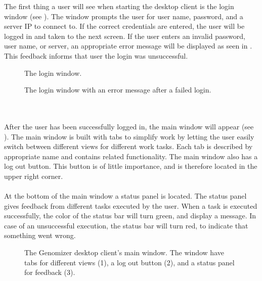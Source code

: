 The first thing a user will see when starting the desktop client is the login window (see ). The window prompts the user for user name, password, and a server IP to connect to. If the correct credentials are entered, the user will be logged in and taken to the next screen. If the user enters an invalid password, user name, or server, an appropriate error message will be displayed as seen in . This feedback informs that user the login was unsuccessful.
\begin{figure}[h]
	\caption{The login window.}
	\label{fig:des_login_window}
\end{figure}
\begin{figure}[h!]
	\caption{The login window with an error message after a failed login.}
	\label{fig:des_login_failed}
\end{figure}
\\\\
After the user has been successfully logged in, the main window will appear (see ). The main window  is built with tabs to simplify work by letting the user easily switch between different views for different work tasks. Each tab is described by appropriate name and contains related functionality. The main window also has a log out button. This button is of little importance, and is therefore located in the upper right corner.
\\\\
At the bottom of the main window a status panel is located. The status panel gives feedback from different tasks executed by the user. When a task is executed successfully, the color of the status bar will turn green, and display a message. In case of an unsuccessful execution, the status bar will turn red, to indicate that something went wrong.
\begin{figure}[h]
	\caption{The Genomizer desktop client's main window. The window have tabs for different views (1), a log out button (2), and a status panel for feedback (3).}
	\label{fig:des_main_window}
\end{figure}

